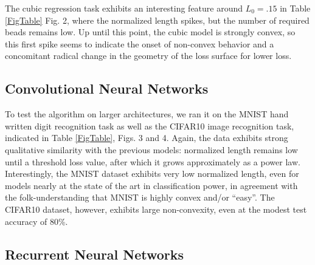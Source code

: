 \begin{center}
  \label{FigTable}
\end{center}

 
 The cubic regression task exhibits an interesting feature around $L_0=.15$ in Table \ref{FigTable} Fig. 2, where the normalized length spikes, but the number of required beads remains low.  Up until this point, the cubic model is strongly convex, so this first spike seems to indicate the onset of non-convex behavior and a concomitant radical change in the geometry of the loss surface for lower loss.
  
 
\subsection{Convolutional Neural Networks}
\label{sec:CNN}

 To test the algorithm on larger architectures, we ran it on the MNIST hand written digit recognition task as well as the CIFAR10 image recognition task, indicated in Table \ref{FigTable}, Figs. 3 and 4.  Again, the data exhibits strong qualitative similarity with the previous models: normalized length remains low until a threshold loss value, after which it grows approximately as a power law.  Interestingly, the MNIST dataset exhibits very low normalized length, even for models nearly at the state of the art in classification power, in agreement with the folk-understanding that MNIST is highly convex and/or ``easy''.  The CIFAR10 dataset, however, exhibits large non-convexity, even at the modest test accuracy of 80\%.


\subsection{Recurrent Neural Networks}

